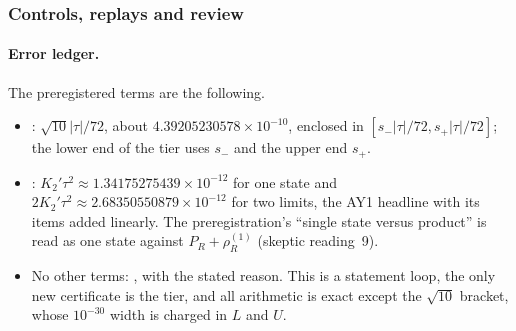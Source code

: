 \subsubsection{Controls, replays and review}
\label{sec:ay2-evidence}
\paragraph{Error ledger.}
The preregistered terms are the following.
\begin{itemize}
\item {}: $\sqrt{10}|\tau|/72$, about
 $4.39205230578\times10^{-10}$, enclosed in $[s_-|\tau|/72,s_+|\tau|/72]$;
 the lower end of the tier uses $s_-$ and the upper end $s_+$.
\item {}: $K_2'\tau^2\approx1.34175275439\times10^{-12}$
 for one state and $2K_2'\tau^2\approx2.68350550879\times10^{-12}$ for two
 limits, the AY1 headline with its items added linearly. The
 preregistration's ``single state versus product'' is read as one state
 against $P_R+\rho^{(1)}_R$ (skeptic reading~9).
\item No other terms: , with the stated reason. This is
 a statement loop, the only new certificate is the tier, and all arithmetic
 is exact except the $\sqrt{10}$ bracket, whose $10^{-30}$ width is charged in
 $L$ and $U$.
\end{itemize}

